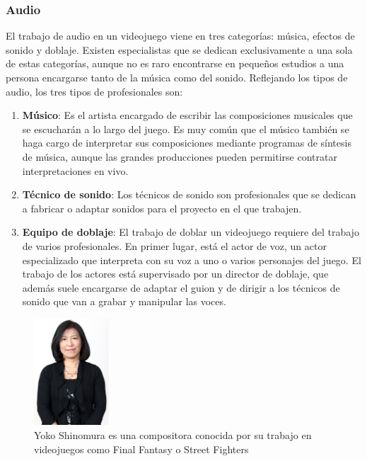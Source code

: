 \subsubsection{Audio}
El trabajo de audio en un videojuego viene en tres categorías: música, efectos de sonido y doblaje. Existen especialistas que se dedican exclusivamente a una sola de estas categorías, aunque no es raro encontrarse en pequeños estudios a una persona encargarse tanto de la música como del sonido. Reflejando los tipos de audio, los tres tipos de profesionales son\cite{development_and_production}:
\begin{enumerate}
\item \textbf{Músico}: Es el artista encargado de escribir las composiciones musicales que se escucharán a lo largo del juego. Es muy común que el músico también se haga cargo de interpretar sus composiciones mediante programas de síntesis de música, aunque las grandes producciones pueden permitirse contratar interpretaciones en vivo.
\item \textbf{Técnico de sonido}: Los técnicos de sonido son profesionales que se dedican a fabricar o adaptar sonidos para el proyecto en el que trabajen.
\item \textbf{Equipo de doblaje}: El trabajo de doblar un videojuego requiere del trabajo de varios profesionales. En primer lugar, está el actor de voz, un actor especializado que interpreta con su voz a uno o varios personajes del juego. El trabajo de los actores está supervisado por un director de doblaje, que además suele encargarse de adaptar el guion y de dirigir a los técnicos de sonido que van a grabar y manipular las voces.
\end{enumerate}
\begin{figure}[h]
    \centering
    \includegraphics[width=0.25\textwidth]{images/estadodelarte/desarrollo/yoko-shimomura}
    \caption{Yoko Shinomura es una compositora conocida por su trabajo en videojuegos como Final Fantasy o Street Fighters}
\end{figure}

